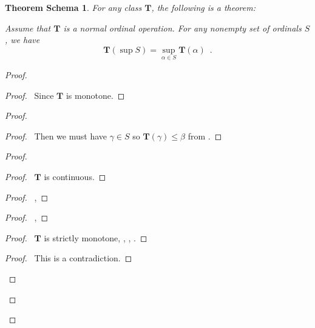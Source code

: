 \documentclass{book}
\let\qed\relax
\newtheorem{thms}[ax]{Theorem Schema}
\theoremstyle{definition}
\begin{document}
\begin{thms}
\label{thm:normalsup}
For any class $\mathbf{T}$, the following is a theorem:

Assume that $\mathbf{T}$ is a normal ordinal operation. For any nonempty set of ordinals $S$, we have
\[ \mathbf{T}(\sup S) = \sup_{\alpha \in S} \mathbf{T}(\alpha) \enspace . \]
\end{thms}

\begin{proof}
\pf
{}
\begin{proof}
	\pf\ Since $\mathbf{T}$ is monotone.
\end{proof}
\begin{proof}
	\begin{proof}
		\pf\ Then we must have $\gamma \in S$ so $\mathbf{T}(\gamma) \leq \beta$ from .
	\end{proof}
	\begin{proof}
		\begin{proof}
			\pf\ $\mathbf{T}$ is continuous.
		\end{proof}
		\begin{proof}
			\pf\ , 
		\end{proof}
		\begin{proof}
			\pf\ , 
		\end{proof}
		\begin{proof}
			\pf\ $\mathbf{T}$ is strictly monotone, , , .
		\end{proof}
		\qedstep
		\begin{proof}
			\pf\ This is a contradiction.
		\end{proof}
	\end{proof}
\end{proof}
\qed
\end{proof}
\end{document}

